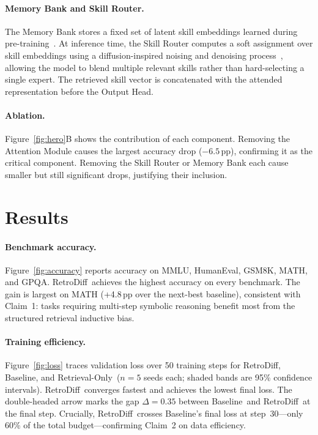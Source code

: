 \documentclass[10pt,twocolumn]{article}
\newcommand{\methodname}{RetroDiff}
\newcommand{\baselineA}{Baseline}
\newcommand{\baselineB}{Retrieval-Only}
\begin{document}
\paragraph{Memory Bank and Skill Router.}
The Memory Bank stores a fixed set of latent skill embeddings learned during
pre-training~\citep{zhang2024retrieval}.
At inference time, the Skill Router computes a soft assignment over skill
embeddings using a diffusion-inspired noising and denoising
process~\citep{ho2020denoising}, allowing the model to blend multiple
relevant skills rather than hard-selecting a single expert.
The retrieved skill vector is concatenated with the attended representation
before the Output Head.

\paragraph{Ablation.}
Figure~\ref{fig:hero}B shows the contribution of each component.
Removing the Attention Module causes the largest accuracy drop ($-6.5$\,pp),
confirming it as the critical component.
Removing the Skill Router or Memory Bank each cause smaller but still
significant drops, justifying their inclusion.

\section{Results}
\label{sec:results}

\paragraph{Benchmark accuracy.}
Figure~\ref{fig:accuracy} reports accuracy on MMLU, HumanEval, GSM8K, MATH, and GPQA.
\methodname\ achieves the highest accuracy on every benchmark.
The gain is largest on MATH (+4.8\,pp over the next-best baseline), consistent
with Claim~1: tasks requiring multi-step symbolic reasoning benefit most from
the structured retrieval inductive bias.

\paragraph{Training efficiency.}
Figure~\ref{fig:loss} traces validation loss over 50 training steps for \methodname,
\baselineA, and \baselineB\ ($n{=}5$ seeds each; shaded bands are 95\%
confidence intervals).
\methodname\ converges fastest and achieves the lowest final loss.
The double-headed arrow marks the gap $\Delta{=}0.35$ between \baselineA\
and \methodname\ at the final step.
Crucially, \methodname\ crosses \baselineA's final loss at step~30---only
60\% of the total budget---confirming Claim~2 on data efficiency.
\end{document}
